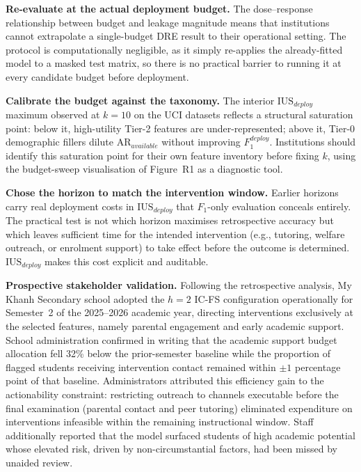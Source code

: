 \documentclass[a4paper,fleqn]{cas-sc}
\begin{document}
\textbf{Re-evaluate at the actual deployment budget.}
The dose--response relationship between budget and leakage magnitude means that institutions cannot extrapolate a single-budget DRE result to their operational setting. The protocol is computationally negligible, as it simply re-applies the already-fitted model to a masked test matrix, so there is no practical barrier to running it at every candidate budget before deployment.

\textbf{Calibrate the budget against the taxonomy.}
The interior $\mathrm{IUS}_{deploy}$ maximum observed at $k=10$ on the UCI datasets reflects a structural saturation point: below it, high-utility Tier-2 features are under-represented; above it, Tier-0 demographic fillers dilute $\mathrm{AR}_{available}$ without improving $F^{deploy}_1$. Institutions should identify this saturation point for their own feature inventory before fixing $k$, using the budget-sweep visualisation of Figure~R1 as a diagnostic tool.

\textbf{Chose the horizon to match the intervention window.}
Earlier horizons carry real deployment costs in $\mathrm{IUS}_{deploy}$ that $F_1$-only evaluation conceals entirely. The practical test is not which horizon maximises retrospective accuracy but which leaves sufficient time for the intended intervention (e.g., tutoring, welfare outreach, or enrolment support) to take effect before the outcome is determined. $\mathrm{IUS}_{deploy}$ makes this cost explicit and auditable.

\textbf{Prospective stakeholder validation.}
Following the retrospective analysis, My Khanh Secondary school adopted the $h = 2$ IC-FS configuration operationally for Semester~2 of the 2025--2026 academic year, directing interventions exclusively at the selected features, namely parental engagement and early academic support. School administration confirmed in writing that the academic support budget allocation fell 32\% below the prior-semester baseline while the proportion of flagged students receiving intervention contact remained within $\pm 1$ percentage point of that baseline. Administrators attributed this efficiency gain to the actionability constraint: restricting outreach to channels executable before the final examination (parental contact and peer tutoring) eliminated expenditure on interventions infeasible within the remaining instructional window. Staff additionally reported that the model surfaced students of high academic potential whose elevated risk, driven by non-circumstantial factors, had been missed by unaided review.
\end{document}
